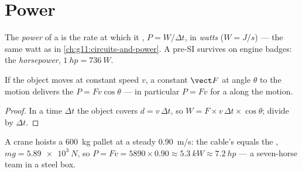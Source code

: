 \section{Power}

\begin{definition}[Power]\label{def:g11:work-of-force:power}
The \emph{power} of a  is the rate at
which it , $P = W/\Delta t$, in \emph{watts}
($\unit{W} = \unit{J/s}$) --- the same watt as in
\cref{ch:g11:circuits-and-power}. A pre-SI  survives on engine
badges: the \emph{horsepower},
$\qty{1}{hp} = \qty{736}{W}$.
\end{definition}

\begin{proposition}\label{prop:g11:work-of-force:pfv}
If the object moves at constant speed $v$, a constant  $\vect F$
at angle $\theta$ to the motion delivers the 
$P = F v \cos\theta$ --- in particular $P = Fv$ for a  along the
motion.
\end{proposition}

\begin{proof}
In a time $\Delta t$ the object covers $d = v\,\Delta t$, so
$W = F \times v\,\Delta t \times \cos\theta$; divide by $\Delta t$.
\end{proof}

\begin{example}[Crane]\label{ex:g11:work-of-force:crane}
A crane hoists a \qty{600}{kg} pallet at a steady \qty{0.90}{m/s}: the
cable's  equals the , $mg = \qty{5.89e3}{N}$, so
$P = Fv = 5890 \times 0.90 \approx \qty{5.3}{kW} \approx \qty{7.2}{hp}$
--- a seven-horse team in a steel box.
\end{example}

